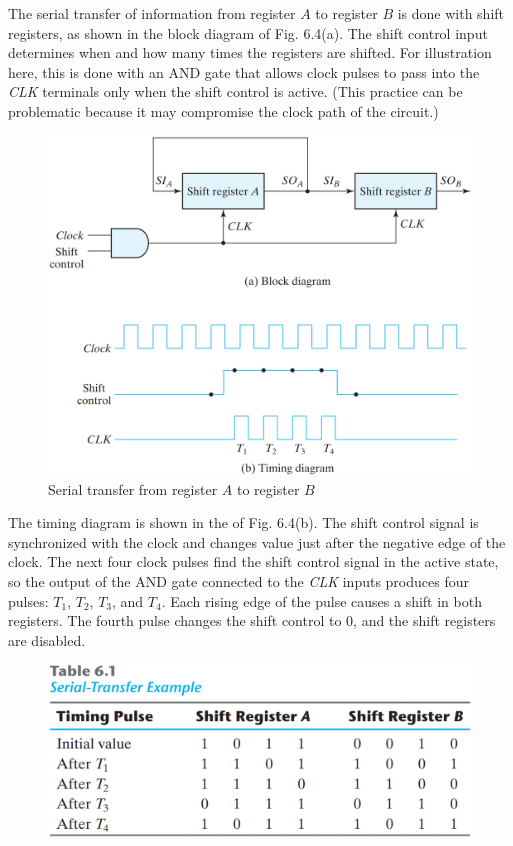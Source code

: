 The serial transfer of information from register $A$ to register $B$ is done with shift registers, as shown in the block diagram of Fig. 6.4(a). The shift control input determines when and how many times the registers are shifted. For illustration here, this is done with an AND gate that allows clock pulses to pass into the \textit{CLK} terminals only when the shift control is active. (This practice can be problematic because it may compromise the clock path of the circuit.)
\begin{figure}[H]
  \centering
  \includegraphics[width=\linewidth]{img/fig-6.4.png}
  \caption{Serial transfer from register $A$ to register $B$}
  \label{fig:6.4}
\end{figure}
\noindent The timing diagram is shown in the of Fig. 6.4(b). The shift control signal is synchronized with the clock and changes value just after the negative edge of the clock. The next four clock pulses find the shift control signal in the active state, so the output of the AND gate connected to the \textit{CLK} inputs produces four pulses: $T_1$, $T_2$, $T_3$, and $T_4$. Each rising edge of the pulse causes a shift in both registers. The fourth pulse changes the shift control to 0, and the shift registers are disabled.
\begin{figure}[H]
  \centering
  \includegraphics[width=\linewidth]{img/table-6.1.png}
  \label{table:6.1}
\end{figure}

